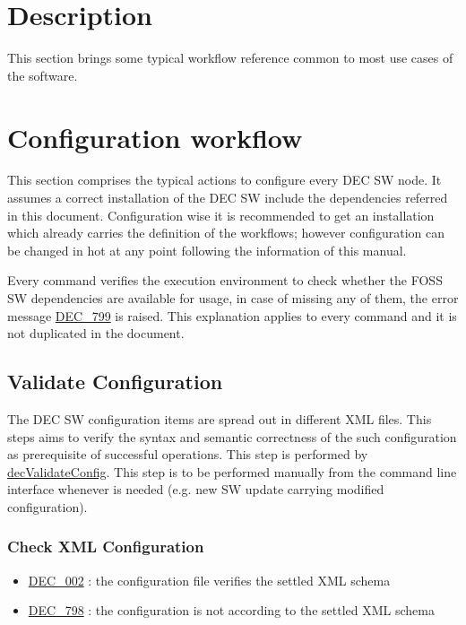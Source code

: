 \documentclass[dec_sum_main.tex]{subfiles}
\begin{document}
\section{Description}
This section brings some typical workflow reference common to most use cases of the software.

\section{Configuration workflow}
This section comprises the typical actions to configure every DEC SW node. It assumes a correct installation of the DEC SW include the dependencies referred in this document. Configuration wise it is recommended to get an installation which already carries the definition of the workflows; however configuration can be changed in hot at any point following the information of this manual. 
\par \noindent
Every command verifies the execution environment to check whether the FOSS SW dependencies are available for usage, in case of missing any of them, the error message \hyperref[DEC799]{DEC\_799} is raised. This explanation applies to every command and it is not duplicated in the document.\newline


\subsection{Validate Configuration}
The DEC SW configuration items are spread out in different XML files. This steps aims to verify the syntax and semantic correctness of the such configuration as prerequisite of successful operations. This step is performed by \hyperref[decValidateConfig]{decValidateConfig}. This step is to be performed manually from the command line interface whenever is needed (e.g. new SW update carrying modified configuration).\newline

\subsubsection{Check XML Configuration}
\begin{itemize}
    \item \hyperref[DEC002]{DEC\_002} : the configuration file verifies the settled XML schema
	\item \hyperref[DEC798]{DEC\_798} : the configuration is not according to the settled XML schema
\end{itemize}
\end{document}
